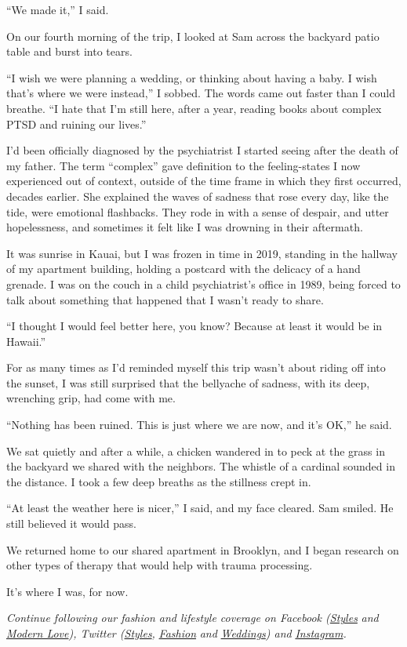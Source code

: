 ``We made it,'' I said.

On our fourth morning of the trip, I looked at Sam across the backyard
patio table and burst into tears.

``I wish we were planning a wedding, or thinking about having a baby. I
wish that's where we were instead,'' I sobbed. The words came out faster
than I could breathe. ``I hate that I'm still here, after a year,
reading books about complex PTSD and ruining our lives.''

I'd been officially diagnosed by the psychiatrist I started seeing after
the death of my father. The term ``complex'' gave definition to the
feeling-states I now experienced out of context, outside of the time
frame in which they first occurred, decades earlier. She explained the
waves of sadness that rose every day, like the tide, were emotional
flashbacks. They rode in with a sense of despair, and utter
hopelessness, and sometimes it felt like I was drowning in their
aftermath.

It was sunrise in Kauai, but I was frozen in time in 2019, standing in
the hallway of my apartment building, holding a postcard with the
delicacy of a hand grenade. I was on the couch in a child psychiatrist's
office in 1989, being forced to talk about something that happened that
I wasn't ready to share.

``I thought I would feel better here, you know? Because at least it
would be in Hawaii.''

For as many times as I'd reminded myself this trip wasn't about riding
off into the sunset, I was still surprised that the bellyache of
sadness, with its deep, wrenching grip, had come with me.

``Nothing has been ruined. This is just where we are now, and it's OK,''
he said.

We sat quietly and after a while, a chicken wandered in to peck at the
grass in the backyard we shared with the neighbors. The whistle of a
cardinal sounded in the distance. I took a few deep breaths as the
stillness crept in.

``At least the weather here is nicer,'' I said, and my face cleared. Sam
smiled. He still believed it would pass.

We returned home to our shared apartment in Brooklyn, and I began
research on other types of therapy that would help with trauma
processing.

It's where I was, for now.

\emph{Continue following our fashion and lifestyle coverage on Facebook
(}\href{https://www.facebook.com/nytimesstyles}{\emph{Styles}}
\emph{and} \href{https://www.facebook.com/modernlove}{\emph{Modern
Love}}\emph{), Twitter
(}\href{https://twitter.com/nytstyles}{\emph{Styles}}\emph{,}
\href{https://twitter.com/nytfashion}{\emph{Fashion}} \emph{and}
\href{https://twitter.com/nytimesvows}{\emph{Weddings}}\emph{) and}
\href{https://instagram.com/nytimesfashion}{\emph{Instagram}}\emph{.}

